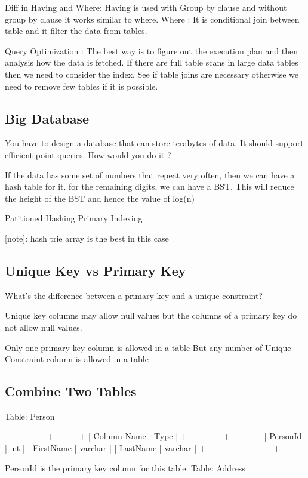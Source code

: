 Diff in Having and Where: 
Having is used with Group by clause and without group by clause it works similar to where. 
Where : It is conditional join between table and it filter the data from tables. 

Query Optimization : The best way is to figure out the execution plan and then analysis how the data is fetched. If there are full table scans in large data tables then we need to 
consider the index. See if table joins are necessary otherwise we need to remove few tables if it is possible. 

\subsection{Big Database}

You have to design a database that can store terabytes of data. It should support efficient point queries. How would you do it ?

If the data has some set of numbers that repeat very often, then we can have a hash table for it. for the remaining digits, we can have a BST. This will reduce the height of the 
BST and hence the value of log(n)

Patitioned Hashing Primary Indexing

[note]: hash trie array is the best in this case

\subsection{Unique Key vs Primary Key}
What's the difference between a primary key and a unique constraint?

Unique key columns may allow null values but the columns of a primary key do not allow null values.

Only one primary key column is allowed in a table 
But any number of Unique Constraint column is allowed in a table

\subsection{Combine Two Tables}
Table: Person
\begin{Code}
	+-------------+---------+
	| Column Name | Type    |
	+-------------+---------+
	| PersonId    | int     |
	| FirstName   | varchar |
	| LastName    | varchar |
	+-------------+---------+
\end{Code}

PersonId is the primary key column for this table.
Table: Address

